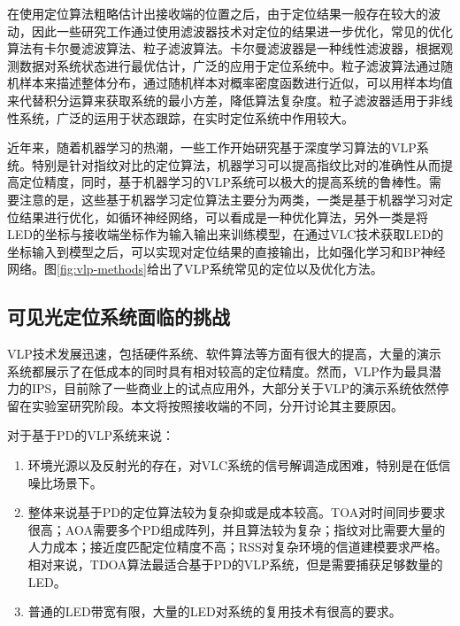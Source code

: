 在使用定位算法粗略估计出接收端的位置之后，由于定位结果一般存在较大的波动，因此一些研究工作通过使用滤波器技术对定位的结果进一步优化，常见的优化算法有卡尔曼滤波算法\cite{vlp-kf}、粒子滤波算法\cite{vlp-pf}。卡尔曼滤波器是一种线性滤波器，根据观测数据对系统状态进行最优估计，广泛的应用于定位系统中。粒子滤波算法通过随机样本来描述整体分布，通过随机样本对概率密度函数进行近似，可以用样本均值来代替积分运算来获取系统的最小方差，降低算法复杂度。粒子滤波器适用于非线性系统，广泛的运用于状态跟踪，在实时定位系统中作用较大。

近年来，随着机器学习的热潮，一些工作开始研究基于深度学习算法的VLP系统\cite{vlp-ml-tran2022machine}。特别是针对指纹对比的定位算法，机器学习可以提高指纹比对的准确性从而提高定位精度，同时，基于机器学习的VLP系统可以极大的提高系统的鲁棒性。需要注意的是，这些基于机器学习定位算法主要分为两类，一类是基于机器学习对定位结果进行优化，如循环神经网络，可以看成是一种优化算法\cite{vlp-ml-1,vlp-ml-RNN}，另外一类是将LED的坐标与接收端坐标作为输入输出来训练模型，在通过VLC技术获取LED的坐标输入到模型之后，可以实现对定位结果的直接输出，比如强化学习和BP神经网络\cite{vlp-ml-2,vlp-ml-3,vlp-ml-RL}。图\ref{fig:vlp-methods}给出了VLP系统常见的定位以及优化方法。


\subsection{可见光定位系统面临的挑战}
VLP技术发展迅速，包括硬件系统、软件算法等方面有很大的提高，大量的演示系统都展示了在低成本的同时具有相对较高的定位精度。然而，VLP作为最具潜力的IPS，目前除了一些商业上的试点应用外，大部分关于VLP的演示系统依然停留在实验室研究阶段。本文将按照接收端的不同，分开讨论其主要原因。

对于基于PD的VLP系统来说：
\begin{enumerate}[topsep = 0 pt, itemsep= 0 pt, parsep=0pt, partopsep=0pt, leftmargin=20pt, itemindent=0pt, labelsep=6pt, label={(\arabic*)}] 

    \item 环境光源以及反射光的存在，对VLC系统的信号解调造成困难，特别是在低信噪比场景下。
    \item 整体来说基于PD的定位算法较为复杂抑或是成本较高。TOA对时间同步要求很高；AOA需要多个PD组成阵列，并且算法较为复杂；指纹对比需要大量的人力成本；接近度匹配定位精度不高；RSS对复杂环境的信道建模要求严格。相对来说，TDOA算法最适合基于PD的VLP系统，但是需要捕获足够数量的LED。
    \item 普通的LED带宽有限，大量的LED对系统的复用技术有很高的要求。
\end{enumerate}

